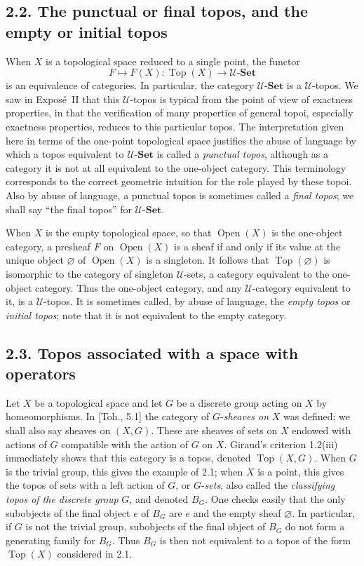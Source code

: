 \documentclass[11pt]{article}
\newcommand{\U}{\mathcal{U}}
\newcommand{\Set}{\mathbf{Set}}
\newcommand{\Top}{\operatorname{Top}}
\newcommand{\Open}{\operatorname{Open}}
\begin{document}
\subsection*{2.2. The punctual or final topos, and the empty or initial topos}
When \(X\) is a topological space reduced to a single point, the functor
\[
F\longmapsto F(X):\Top(X)\longrightarrow \U\text{-}\Set
\]
is an equivalence of categories. In particular, the category \(\U\text{-}\Set\) is a \(\U\)-topos. We saw in Expos\'e~II that this \(\U\)-topos is typical from the point of view of exactness properties, in that the verification of many properties of general topoi, especially exactness properties, reduces to this particular topos. The interpretation given here in terms of the one-point topological space justifies the abuse of language by which a topos equivalent to \(\U\text{-}\Set\) is called a \emph{punctual topos}, although as a category it is not at all equivalent to the one-object category. This terminology corresponds to the correct geometric intuition for the role played by these topoi. Also by abuse of language, a punctual topos is sometimes called a \emph{final topos}; we shall say ``the final topos'' for \(\U\text{-}\Set\).

When \(X\) is the empty topological space, so that \(\Open(X)\) is the one-object category, a presheaf \(F\) on \(\Open(X)\) is a sheaf if and only if its value at the unique object \(\varnothing\) of \(\Open(X)\) is a singleton. It follows that \(\Top(\varnothing)\) is isomorphic to the category of singleton \(\U\)-sets, a category equivalent to the one-object category. Thus the one-object category, and any \(\U\)-category equivalent to it, is a \(\U\)-topos. It is sometimes called, by abuse of language, the \emph{empty topos} or \emph{initial topos}; note that it is not equivalent to the empty category.

\subsection*{2.3. Topos associated with a space with operators}
Let \(X\) be a topological space and let \(G\) be a discrete group acting on \(X\) by homeomorphisms. In [Toh., 5.1] the category of \(G\)-\emph{sheaves on} \(X\) was defined; we shall also say sheaves on \((X,G)\). These are sheaves of sets on \(X\) endowed with actions of \(G\) compatible with the action of \(G\) on \(X\). Giraud's criterion 1.2(iii) immediately shows that this category is a topos, denoted \(\Top(X,G)\). When \(G\) is the trivial group, this gives the example of 2.1; when \(X\) is a point, this gives the topos of sets with a left action of \(G\), or \(G\)-\emph{sets}, also called the \emph{classifying topos of the discrete group} \(G\), and denoted \(B_G\). One checks easily that the only subobjects of the final object \(e\) of \(B_G\) are \(e\) and the empty sheaf \(\varnothing\). In particular, if \(G\) is not the trivial group, subobjects of the final object of \(B_G\) do not form a generating family for \(B_G\). Thus \(B_G\) is then not equivalent to a topos of the form \(\Top(X)\) considered in 2.1.
\end{document}
